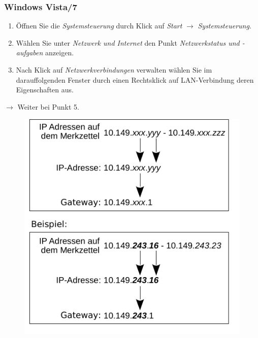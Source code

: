 \documentclass[a4paper,12pt]{scrartcl}
\begin{document}
\subsubsection*{Windows Vista/7}
\begin{enumerate}
    \item Öffnen Sie die \emph{Systemsteuerung} durch Klick auf \emph{Start} $\rightarrow$ \emph{Systemsteuerung}.
    \item Wählen Sie unter \emph{Netzwerk und Internet} den Punkt \emph{Netzwerkstatus und -aufgaben} anzeigen.
    \item Nach Klick auf \emph{Netzwerkverbindungen} verwalten wählen Sie im darauffolgenden Fenster durch einen Rechtsklick auf LAN-Verbindung deren Eigenschaften aus.
\end{enumerate}
$\rightarrow$ Weiter bei Punkt 5.
      \begin{figure}[h!]
	\centering
        \vspace{-5pt}
        \begin{minipage}[c]{0.45\linewidth}
          \centering
          \includegraphics[width=\linewidth,keepaspectratio]{Bilder/IP_Gerneric_mb}
        \end{minipage}
        \begin{minipage}[c]{0.48\linewidth}
          \centering

\end{minipage}
\end{figure}
\end{document}
